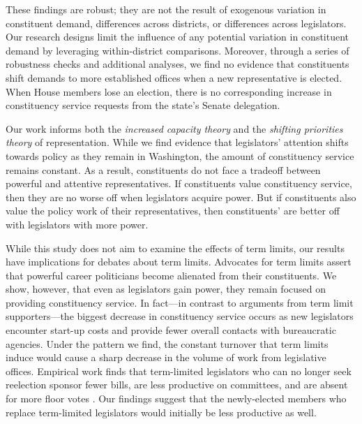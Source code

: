 \documentclass[12pt]{article}
\begin{document}

These findings are robust; they are not the result of exogenous variation in constituent demand, differences across districts, or differences across legislators. Our research designs limit the influence of any potential variation in constituent demand by leveraging within-district comparisons. Moreover, through a series of robustness checks and additional analyses, we find no evidence that constituents shift demands to more established offices when a new representative is elected. When House members lose an election, there is no corresponding increase in constituency service requests from the state's Senate delegation. 

Our work informs both the \textit{increased capacity theory} and the \textit{shifting priorities theory} of representation. While we find evidence that legislators' attention shifts towards policy as they remain in Washington, the amount of constituency service remains constant. As a result, constituents do not face a tradeoff between powerful and attentive representatives.   If constituents value constituency service, then they are no worse off when legislators acquire power. But if constituents also value the policy work of their representatives, then constituents' are better off with legislators with more power. 

While this study does not aim to examine the effects of term limits, our results have implications for debates about term limits. Advocates for term limits assert that powerful career politicians become alienated from their constituents. We show, however, that even as legislators gain power, they remain focused on providing constituency service. In fact---in contrast to arguments from term limit supporters---the biggest decrease in constituency service occurs as new legislators encounter start-up costs and provide fewer overall contacts with bureaucratic agencies. Under the pattern we find, the constant turnover that term limits induce would cause a sharp decrease in the volume of work from legislative offices. Empirical work finds that term-limited legislators who can
no longer seek reelection sponsor fewer bills, are less productive on committees, and are absent for more floor votes \citep{Fouirnaies2021}. Our findings suggest that the newly-elected members who replace term-limited legislators would initially be less productive as well. 
\end{document}
